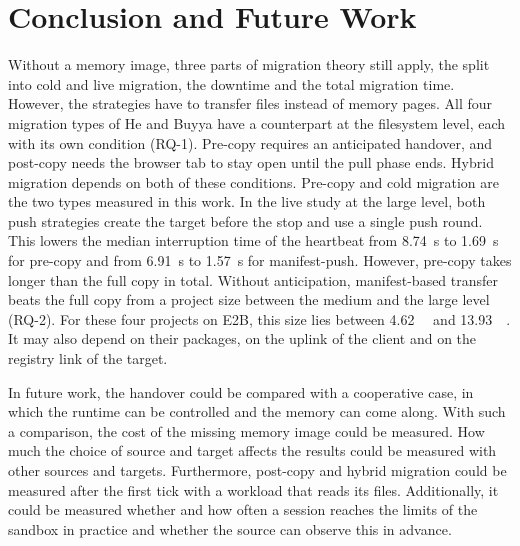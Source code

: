 \section{Conclusion and Future Work}
\label{sec:conclusion}

Without a memory image, three parts of migration theory still apply, the split into cold and live migration, the downtime and the total migration time. However, the strategies have to transfer files instead of memory pages. All four migration types of He and Buyya have a counterpart at the filesystem level, each with its own condition (RQ-1). Pre-copy requires an anticipated handover, and post-copy needs the browser tab to stay open until the pull phase ends. Hybrid migration depends on both of these conditions. Pre-copy and cold migration are the two types measured in this work. In the live study at the large level, both push strategies create the target before the stop and use a single push round. This lowers the median interruption time of the heartbeat from \SI{8.74}{\second} to \SI{1.69}{\second} for pre-copy and from \SI{6.91}{\second} to \SI{1.57}{\second} for manifest-push. However, pre-copy takes longer than the full copy in total. Without anticipation, manifest-based transfer beats the full copy from a project size between the medium and the large level (RQ-2). For these four projects on E2B, this size lies between \SI{4.62}{\mega\byte} and \SI{13.93}{\mega\byte}. It may also depend on their packages, on the uplink of the client and on the registry link of the target.

In future work, the handover could be compared with a cooperative case, in which the runtime can be controlled and the memory can come along. With such a comparison, the cost of the missing memory image could be measured. How much the choice of source and target affects the results could be measured with other sources and targets. Furthermore, post-copy and hybrid migration could be measured after the first tick with a workload that reads its files. Additionally, it could be measured whether and how often a session reaches the limits of the sandbox in practice and whether the source can observe this in advance.
